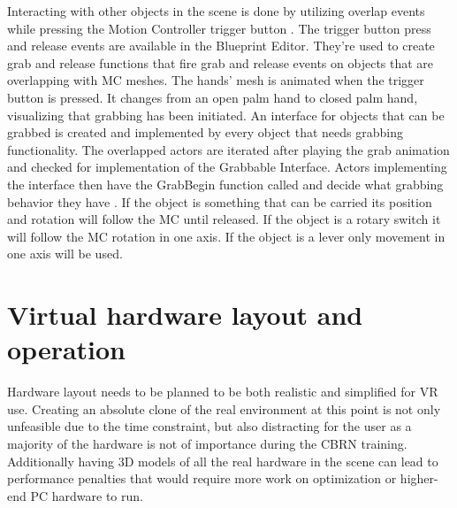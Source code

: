 \documentclass[12pt, a4paper,oneside, nocenter]{thesis}
\begin{document}
Interacting with other objects in the scene is done by utilizing overlap events while pressing the Motion Controller trigger button . The trigger button press and release events are available in the Blueprint Editor. They're used to create grab and release functions that fire grab and release events on objects that are overlapping with MC meshes. The hands' mesh is animated when the trigger button is pressed. It changes from an open palm hand to closed palm hand, visualizing that grabbing has been initiated. An interface for objects that can be grabbed is created and implemented by every object that needs grabbing functionality. The overlapped actors are iterated after playing the grab animation and checked for implementation of the Grabbable Interface. Actors implementing the interface then have the GrabBegin function called and decide what grabbing behavior they have . If the object is something that can be carried its position and rotation will follow the MC until released. If the object is a rotary switch it will follow the MC rotation in one axis. If the object is a lever only movement in one axis will be used.
\section{Virtual hardware layout and operation}
Hardware layout needs to be planned to be both realistic and simplified for VR use. Creating an absolute clone of the real environment at this point is not only unfeasible due to the time constraint, but also distracting for the user as a majority of the hardware is not of importance during the CBRN training. Additionally having 3D models of all the real hardware in the scene can lead to performance penalties that would require more work on optimization or higher-end PC hardware to run.
\end{document}
